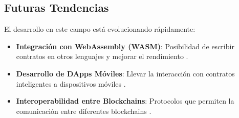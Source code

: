 \subsection{Futuras Tendencias}

El desarrollo en este campo está evolucionando rápidamente:

\begin{itemize}
    \item \textbf{Integración con WebAssembly (WASM)}: Posibilidad de escribir contratos en otros lenguajes y mejorar el rendimiento \cite{wood2019polkadot}.

    \item \textbf{Desarrollo de DApps Móviles}: Llevar la interacción con contratos inteligentes a dispositivos móviles \cite{he2018blockchain}.

    \item \textbf{Interoperabilidad entre Blockchains}: Protocolos que permiten la comunicación entre diferentes blockchains \cite{belchior2021survey}.

\end{itemize}
